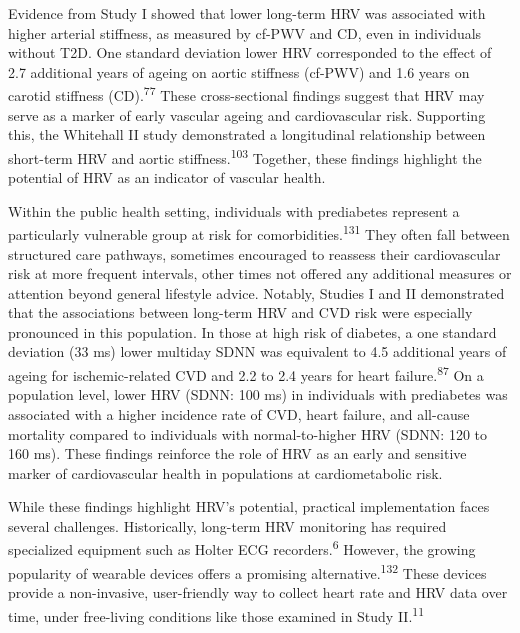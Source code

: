 \documentclass[
  a4paper,
  headsepline=true,
  open=left]{scrbook}
\begin{document}
Evidence from Study I showed that lower long-term HRV was associated
with higher arterial stiffness, as measured by cf-PWV and CD, even in
individuals without T2D. One standard deviation lower HRV corresponded
to the effect of 2.7 additional years of ageing on aortic stiffness
(cf-PWV) and 1.6 years on carotid stiffness (CD).\textsuperscript{77}
These cross-sectional findings suggest that HRV may serve as a marker of
early vascular ageing and cardiovascular risk. Supporting this, the
Whitehall II study demonstrated a longitudinal relationship between
short-term HRV and aortic stiffness.\textsuperscript{103} Together,
these findings highlight the potential of HRV as an indicator of
vascular health.

Within the public health setting, individuals with prediabetes represent
a particularly vulnerable group at risk for
comorbidities.\textsuperscript{131} They often fall between structured
care pathways, sometimes encouraged to reassess their cardiovascular
risk at more frequent intervals, other times not offered any additional
measures or attention beyond general lifestyle advice. Notably, Studies
I and II demonstrated that the associations between long-term HRV and
CVD risk were especially pronounced in this population. In those at high
risk of diabetes, a one standard deviation (33 ms) lower multiday SDNN
was equivalent to 4.5 additional years of ageing for ischemic-related
CVD and 2.2 to 2.4 years for heart failure.\textsuperscript{87} On a
population level, lower HRV (SDNN: 100 ms) in individuals with
prediabetes was associated with a higher incidence rate of CVD, heart
failure, and all-cause mortality compared to individuals with
normal-to-higher HRV (SDNN: 120 to 160 ms). These findings reinforce the
role of HRV as an early and sensitive marker of cardiovascular health in
populations at cardiometabolic risk.

While these findings highlight HRV's potential, practical implementation
faces several challenges. Historically, long-term HRV monitoring has
required specialized equipment such as Holter ECG
recorders.\textsuperscript{6} However, the growing popularity of
wearable devices offers a promising alternative.\textsuperscript{132}
These devices provide a non-invasive, user-friendly way to collect heart
rate and HRV data over time, under free-living conditions like those
examined in Study II.\textsuperscript{11}
\end{document}
